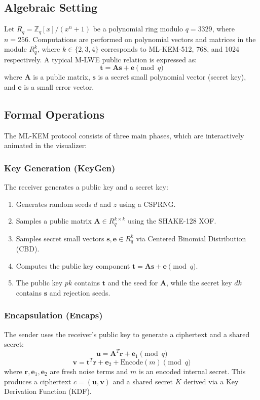 \documentclass[12pt,a4paper]{article}
\begin{document}
\subsection{Algebraic Setting}
Let $R_q = \mathbb{Z}_q[x] / (x^n + 1)$ be a polynomial ring modulo $q=3329$, where $n=256$. Computations are performed on polynomial vectors and matrices in the module $R_q^k$, where $k \in \{2, 3, 4\}$ corresponds to ML-KEM-512, 768, and 1024 respectively. A typical M-LWE public relation is expressed as:
\begin{equation}
\mathbf{t} = \mathbf{A}\mathbf{s} + \mathbf{e} \pmod q
\end{equation}
where $\mathbf{A}$ is a public matrix, $\mathbf{s}$ is a secret small polynomial vector (secret key), and $\mathbf{e}$ is a small error vector.

\subsection{Formal Operations}
The ML-KEM protocol consists of three main phases, which are interactively animated in the visualizer:

\subsubsection{Key Generation (KeyGen)}
The receiver generates a public key and a secret key:
\begin{enumerate}
    \item Generates random seeds $d$ and $z$ using a CSPRNG.
    \item Samples a public matrix $\mathbf{A} \in R_q^{k \times k}$ using the SHAKE-128 XOF.
    \item Samples secret small vectors $\mathbf{s}, \mathbf{e} \in R_q^k$ via Centered Binomial Distribution (CBD).
    \item Computes the public key component $\mathbf{t} = \mathbf{A}\mathbf{s} + \mathbf{e} \pmod q$.
    \item The public key $pk$ contains $\mathbf{t}$ and the seed for $\mathbf{A}$, while the secret key $dk$ contains $\mathbf{s}$ and rejection seeds.
\end{enumerate}

\subsubsection{Encapsulation (Encaps)}
The sender uses the receiver's public key to generate a ciphertext and a shared secret:
\begin{equation}
\mathbf{u} = \mathbf{A}^T \mathbf{r} + \mathbf{e}_1 \pmod q
\end{equation}
\begin{equation}
\mathbf{v} = \mathbf{t}^T \mathbf{r} + \mathbf{e}_2 + \mathrm{Encode}(m) \pmod q
\end{equation}
where $\mathbf{r}, \mathbf{e}_1, \mathbf{e}_2$ are fresh noise terms and $m$ is an encoded internal secret. This produces a ciphertext $c = (\mathbf{u}, \mathbf{v})$ and a shared secret $K$ derived via a Key Derivation Function (KDF).
\end{document}
